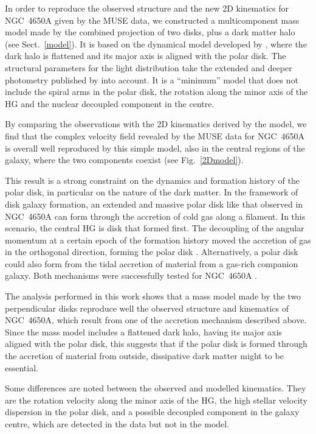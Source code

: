 \documentclass{aa}
\begin{document}
 In order to reproduce the observed structure and the new 2D
  kinematics for NGC~4650A given by the MUSE data, we constructed a
  multicomponent mass model made by the combined projection of two
  disks, plus a dark matter halo (see Sect.~\ref{model}). It is based
  on the dynamical model developed by \citet{Combes1996}, where the dark halo is flattened and  its major axis is aligned with the polar disk. The structural parameters for the light distribution take 
   the extended and deeper photometry published by
  \citet{Iod02} into account. It is a ``minimum'' model that does not include the
  spiral arms in the polar disk, the rotation along the minor axis of the HG and
  the nuclear decoupled component in the centre. 

  By comparing the observations with the 2D kinematics derived by the
  model, we find that the complex velocity field revealed by the MUSE
  data for NGC~4650A is overall well reproduced by this simple model,
  also in the central regions of the galaxy, where the two components
  coexist (see Fig.~\ref{2Dmodel}).  


This result is a strong constraint on the dynamics and formation history of the polar disk, in particular on the nature of the dark matter. 
In the framework of disk galaxy formation, an extended and massive polar disk like that observed in NGC~4650A can form through the accretion of cold gas along a filament. In this scenario, the central HG is disk that formed first. The decoupling of the angular momentum at a certain epoch of the formation history moved the accretion of gas in the orthogonal direction, forming the polar disk \citep{Snaith12,Combes2014}. Alternatively, a polar disk could also form from the tidal accretion of material from a gas-rich companion galaxy. Both mechanisms were successfully tested for  NGC~4650A  \citep{Spav10}. 


The analysis performed in this work shows that a mass model made by the two perpendicular disks  reproduce well the observed structure and kinematics of NGC~4650A, which result from one of the accretion mechanism described above. Since the mass model includes a flattened dark halo, having its major axis aligned with the polar disk, this suggests that if the polar disk is  formed through the accretion of material from outside,  dissipative dark matter might to be essential.

  
  Some differences are noted between the observed and modelled
  kinematics. They are the rotation velocity along the minor axis
  of the HG, the high stellar velocity dispersion in the
  polar disk, and a possible decoupled component in the galaxy
  centre, which are detected in the data but not in the model. 
\end{document}
